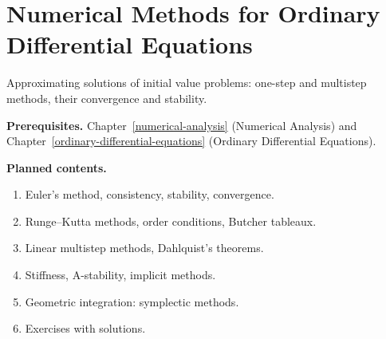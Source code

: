 \chapter{Numerical Methods for Ordinary Differential Equations}\label{numerical-ode}

Approximating solutions of initial value problems: one-step and multistep methods, their convergence
and stability.

\noindent\textbf{Prerequisites.} Chapter~\ref{numerical-analysis} (Numerical Analysis) and Chapter~\ref{ordinary-differential-equations} (Ordinary Differential Equations).

\noindent\textbf{Planned contents.}
\begin{enumerate}
\item Euler's method, consistency, stability, convergence.
\item Runge--Kutta methods, order conditions, Butcher tableaux.
\item Linear multistep methods, Dahlquist's theorems.
\item Stiffness, A-stability, implicit methods.
\item Geometric integration: symplectic methods.
\item Exercises with solutions.
\end{enumerate}
